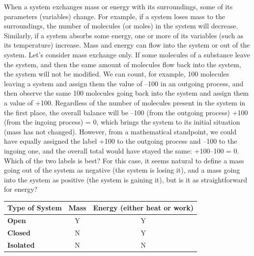 \documentclass[
  9pt,
]{extbook}
\theoremstyle{definition}
\theoremstyle{definition}
\theoremstyle{definition}
\theoremstyle{remark}
\begin{document}
When a system exchanges mass or energy with its surroundings, some of its parameters (variables) change. For example, if a system loses mass to the surroundings, the number of molecules (or moles) in the system will decrease. Similarly, if a system absorbs some energy, one or more of its variables (such as its temperature) increase. Mass and energy can flow into the system or out of the system. Let's consider mass exchange only. If some molecules of a substance leave the system, and then the same amount of molecules flow back into the system, the system will not be modified. We can count, for example, 100 molecules leaving a system and assign them the value of --100 in an outgoing process, and then observe the same 100 molecules going back into the system and assign them a value of +100. Regardless of the number of molecules present in the system in the first place, the overall balance will be --100 (from the outgoing process) +100 (from the ingoing process) = 0, which brings the system to its initial situation (mass has not changed). However, from a mathematical standpoint, we could have equally assigned the label +100 to the outgoing process and --100 to the ingoing one, and the overall total would have stayed the same: +100--100 = 0. Which of the two labels is best? For this case, it seems natural to define a mass going out of the system as negative (the system is losing it), and a mass going into the system as positive (the system is gaining it), but is it as straightforward for energy?

\begin{longtable}[]{@{}lcc@{}}
\toprule
\textbf{Type of System} & \textbf{Mass} & \textbf{Energy} (either heat or work)\tabularnewline
\midrule
\endhead
\textbf{Open} & Y & Y\tabularnewline
\textbf{Closed} & N & Y\tabularnewline
\textbf{Isolated} & N & N\tabularnewline
\bottomrule
\end{longtable}
\end{document}
